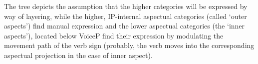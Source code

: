 The tree depicts the assumption that the higher categories will be expressed by way of layering, while the higher, IP-internal aspectual categories (called `outer aspects') find manual expression and the lower aspectual categories (the `inner aspects'), located below VoiceP find their expression by modulating the movement path of the verb sign (probably, the verb moves into the corresponding aspectual projection in the case of inner aspect). 
